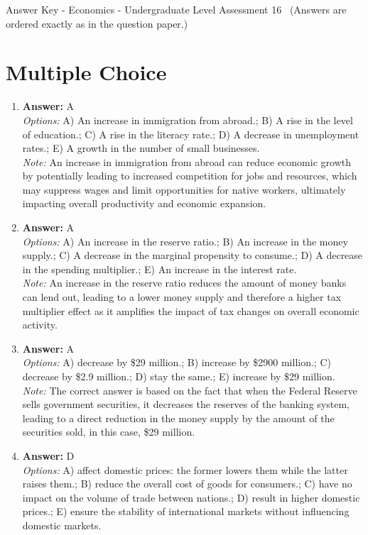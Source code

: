 \documentclass[12pt]{article}
\begin{document}
\begin{center}
Answer Key - Economics - Undergraduate Level Assessment 16 \
\small (Answers are ordered exactly as in the question paper.)
\end{center}

\section*{Multiple Choice}
\begin{enumerate}[label=\arabic*.]
\item \textbf{Answer:} A
\\ \textit{Options:} A) An increase in immigration from abroad.; B) A rise in the level of education.; C) A rise in the literacy rate.; D) A decrease in unemployment rates.; E) A growth in the number of small businesses.
\\ \textit{Note:} An increase in immigration from abroad can reduce economic growth by potentially leading to increased competition for jobs and resources, which may suppress wages and limit opportunities for native workers, ultimately impacting overall productivity and economic expansion.
\item \textbf{Answer:} A
\\ \textit{Options:} A) An increase in the reserve ratio.; B) An increase in the money supply.; C) A decrease in the marginal propensity to consume.; D) A decrease in the spending multiplier.; E) An increase in the interest rate.
\\ \textit{Note:} An increase in the reserve ratio reduces the amount of money banks can lend out, leading to a lower money supply and therefore a higher tax multiplier effect as it amplifies the impact of tax changes on overall economic activity.
\item \textbf{Answer:} A
\\ \textit{Options:} A) decrease by \$29 million.; B) increase by \$2900 million.; C) decrease by \$2.9 million.; D) stay the same.; E) increase by \$29 million.
\\ \textit{Note:} The correct answer is based on the fact that when the Federal Reserve sells government securities, it decreases the reserves of the banking system, leading to a direct reduction in the money supply by the amount of the securities sold, in this case, \$29 million.
\item \textbf{Answer:} D
\\ \textit{Options:} A) affect domestic prices: the former lowers them while the latter raises them.; B) reduce the overall cost of goods for consumers.; C) have no impact on the volume of trade between nations.; D) result in higher domestic prices.; E) ensure the stability of international markets without influencing domestic markets.

\end{enumerate}
\end{document}
